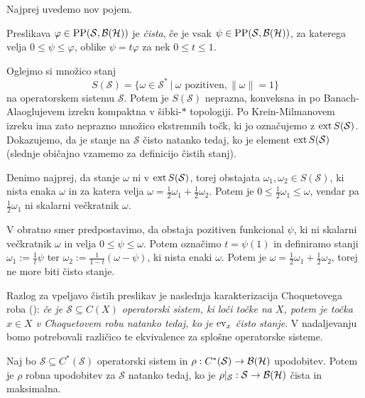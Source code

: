 Najprej uvedemo nov pojem.

\begin{definicija}
    Preslikava $\varphi \in \operatorname{PP} (\mathcal{S}, \operatorname{\mathcal{B} (\mathcal{H})})$ je \emph{čista},
    če je vsak $\psi \in \operatorname{PP} (\mathcal{S}, \operatorname{\mathcal{B} (\mathcal{H})})$, za katerega velja $0 \leq \psi \leq \varphi$,
    oblike $\psi =  t \varphi$ za nek $0 \leq t \leq 1$.
\end{definicija}

\begin{zgled}
    Oglejmo si množico stanj 
    $$S(\mathcal{S}) = \{\omega \in \mathcal{S}^*\ |\ \text{$\omega$ pozitiven}, \| \omega\| = 1 \}$$ 
    na operatorskem sistemu $\mathcal{S}$. Potem je $S(\mathcal{S})$ neprazna, konveksna 
    in po Banach-Alaoglujevem izreku kompaktna v šibki-$*$ topologiji.
    Po Krein-Milmanovem izreku \cite[Theorem V.7.4., str. 142]{conway1990} ima zato neprazno množico ekstremnih točk, ki jo označujemo z $\operatorname{ext} S(\mathcal{S})$.
    Dokazujemo, da je stanje na $\mathcal{S}$ čisto natanko tedaj, ko je element $\operatorname{ext} S(\mathcal{S})$
    (slednje običajno vzamemo za definicijo čistih stanj).

    Denimo najprej, da stanje $\omega$ ni v $\operatorname{ext} S(\mathcal{S})$, torej obstajata $\omega_1, \omega_2 \in S(\mathcal{S})$, ki nista enaka $\omega$ in za katera velja
    $\omega = \frac{1}{2} \omega_1 + \frac{1}{2} \omega_2$. Potem je $0 \leq \frac{1}{2} \omega_1 \leq \omega$,
    vendar pa $\frac{1}{2} \omega_1$ ni skalarni večkratnik $\omega$. 
    
    V obratno smer predpostavimo, da obstaja pozitiven funkcional $\psi$,
    ki ni skalarni večkratnik $\omega$ in velja $0 \leq \psi \leq \omega$. Potem označimo $t = \psi(1)$
    in definiramo stanji $\omega_1 := \frac{1}{t} \psi$ ter $\omega_2 := \frac{1}{1 - t} (\omega - \psi)$, ki nista enaki $\omega$.
    Potem je $\omega = \frac{1}{2} \omega_1 + \frac{1}{2} \omega_2$, torej ne more biti čisto stanje.
\end{zgled}

Razlog za vpeljavo čistih preslikav je naslednja karakterizacija Choquetovega roba (\cite[Proposition 6.2, str. 29]{phelps2001}):
\emph{če je $\mathcal{S} \subseteq C(X)$ operatorski sistem, ki loči točke na $X$,
potem je točka $x \in X$ v Choquetovem robu natanko tedaj, ko je $\operatorname{ev}_x$ čisto stanje}.
V nadaljevanju bomo potrebovali različico te ekvivalence za splošne operatorske sisteme.

\begin{trditev}\label{trd:aux2}
    Naj bo $\mathcal{S} \subseteq C^* (\mathcal{S})$ operatorski sistem in $\rho: C^*(\mathcal{S}) \to \operatorname{\mathcal{B} (\mathcal{H})}$
    upodobitev. Potem je $\rho$ robna upodobitev za $\mathcal{S}$ natanko tedaj, ko je $\rho|_{\mathcal{S}}: \mathcal{S} \to \operatorname{\mathcal{B} (\mathcal{H})}$
    čista in maksimalna.
\end{trditev}

